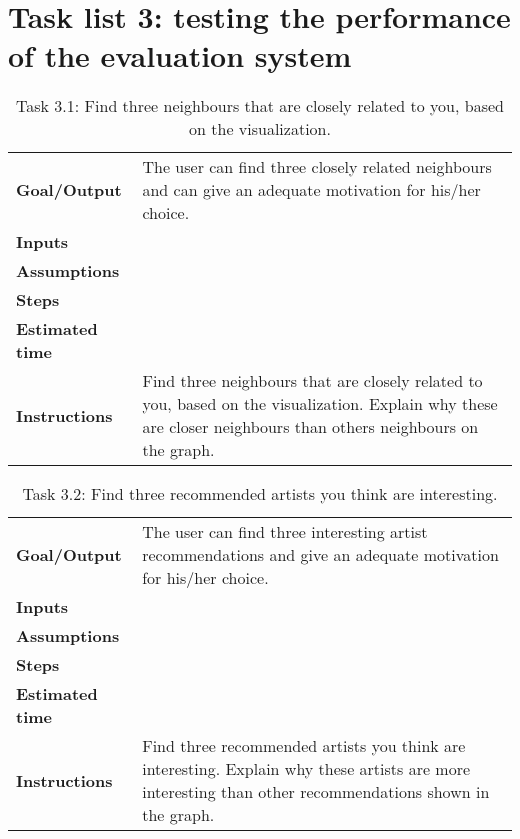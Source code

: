 \section{Task list 3: testing the performance of the evaluation system}\label{appendix:tasklists:prototype3}


\begin{table}
	\caption{Task 3.1: Find three neighbours that are closely related to you, based on the visualization.}
	\begin{tabular}{ p{80px} | p{350px} }
		\hline
		\textbf{Goal/Output}			& The user can find three closely related neighbours and can give an adequate motivation for his/her choice. \\
		\textbf{Inputs}						& \\
		\textbf{Assumptions}			& \\
		\textbf{Steps}						& \\
		\textbf{Estimated time} 	& \\
		\textbf{Instructions}			&
		Find three neighbours that are closely related to you, based on the visualization. Explain why these are closer neighbours than others neighbours on the graph.
		\\
		\hline
	\end{tabular}
	\label{table:task:t7}
\end{table}


\begin{table}
	\caption{Task 3.2: Find three recommended artists you think are interesting.}
	\begin{tabular}{ p{80px} | p{350px} }
		\hline
		\textbf{Goal/Output}			& The user can find three interesting artist recommendations and give an adequate motivation for his/her choice. \\
		\textbf{Inputs}						& \\
		\textbf{Assumptions}			& \\
		\textbf{Steps}						& \\
		\textbf{Estimated time} 	& \\
		\textbf{Instructions}			&
		Find three recommended artists you think are interesting. Explain why these artists are more interesting than other recommendations shown in the graph.
		\\
		\hline
	\end{tabular}
	\label{table:task:t8}
\end{table}


